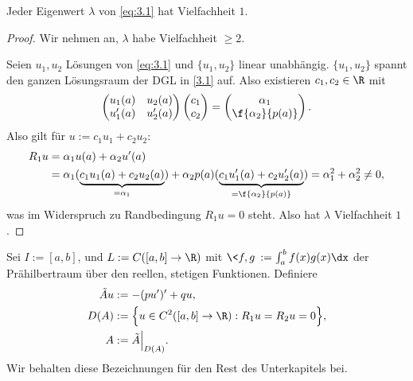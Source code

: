 \begin{st} \label{3.8}
	Jeder Eigenwert $\lambda$ von \eqref{eq:3.1} hat Vielfachheit $1$.
	\begin{proof}
		Wir nehmen an, $\lambda$ habe Vielfachheit $\ge 2$.

		Seien $u_1, u_2$ Lösungen von \eqref{eq:3.1} und $\{u_1,u_2\}$ linear unabhängig.
		$\{u_1,u_2\}$ spannt den ganzen Lösungsraum der DGL in \eqref{3.1} auf.
		Also existieren $c_1,c_2 \in \R$ mit
		\[
			\begin{pmatrix}
				u_1(a) & u_2(a) \\
				u_1'(a) & u_2'(a)
			\end{pmatrix}
			\begin{pmatrix}
				c_1 \\ c_2
			\end{pmatrix}
			= \begin{pmatrix}
				\alpha_1 \\ \f{\alpha_2}{p(a)}
			\end{pmatrix}.
		\]
		Also gilt für $u:= c_1u_1 + c_2 u_2$:
		\begin{align*}
			R_1 u
			&= \alpha_1 u(a) + \alpha_2 u'(a) \\
			&= \alpha_1(\underbrace{c_1u_1(a) + c_2u_2(a)}_{=\alpha_1}) + \alpha_2 p(a) (\underbrace{c_1u_1'(a) + c_2u_2'(a)}_{=\f {\alpha_2}{p(a)}})
			= \alpha_1^2 + \alpha_2^2
			\neq 0,
		\end{align*}
		was im Widerspruch zu Randbedingung $R_1u = 0$ steht.
		Also hat $\lambda$ Vielfachheit $1$.
	\end{proof}
\end{st}

\begin{df} \label{3.9}
	Sei $I := [a,b]$, und $L := C([a,b] \to \R)$ mit $\<f,g\> := \int_a^b f(x)g(x) \dx$ der Prähilbertraum über den reellen, stetigen Funktionen.
	Definiere
	\begin{align}
		\label{eq:3.2}
		\begin{aligned}
			\tilde A u &:= -(pu')' + qu, \\
			D(A) &:= \Big\{ u \in C^2([a,b] \to \R) : R_1u = R_2u = 0 \Big\}, \\
			A &:= \tilde A\Big|_{D(A)}.
		\end{aligned}
	\end{align}
	Wir behalten diese Bezeichnungen für den Rest des Unterkapitels bei.
\end{df}

